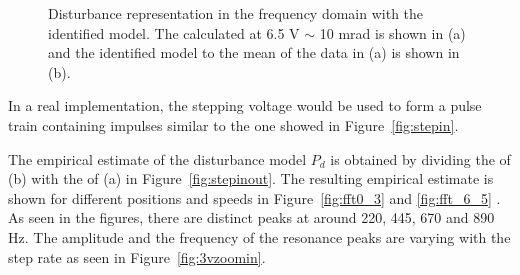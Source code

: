 \begin{figure}[h!]
  \centering %
  \qquad
  \caption{\label{fig:fft_6_5_modelfit} Disturbance representation in the frequency domain with the identified model. The calculated \abbrFFT at 6.5 V $\sim$ 10 mrad is shown in (a) and the identified model to the mean of the data in (a) is shown in (b).}
\end{figure}

In a real implementation, the stepping voltage would be used to form a pulse train containing impulses similar to the one showed in Figure~\ref{fig:stepin}.

The empirical estimate of the disturbance model $P_d$ is obtained by dividing the \abbrFFT of (b) with the \abbrFFT of (a) in Figure~\ref{fig:stepinout}. The resulting empirical estimate is shown for different positions and speeds in Figure~\ref{fig:fft0_3} and \ref{fig:fft_6_5} . As seen in the figures, there are distinct peaks at around 220, 445, 670 and 890 Hz. The amplitude and the frequency of the resonance peaks are varying with the step rate as seen in Figure~\ref{fig:3vzoomin}.

